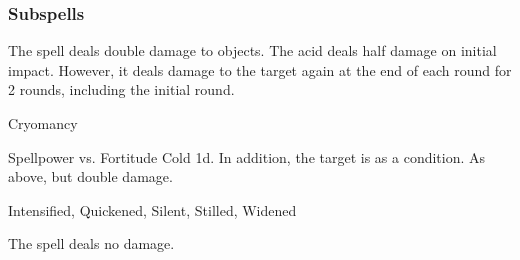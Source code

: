 \subsubsection{Subspells}
The spell deals double damage to objects.
The acid deals half damage on initial impact.
However, it deals damage to the target again at the end of each round for 2 rounds, including the initial round.
\begin{spellsection}{Cryomancy}
\begin{spellheader}
\end{spellheader}
\begin{spellcontent}
\begin{spelltargetinginfo}
\end{spelltargetinginfo}
\begin{spelleffects}
\begin{spellattack}{Spellpower vs. Fortitude}
\spellsuccess
Cold  \minus1d.
In addition, the target is \fatigued as a condition.
\spellcritical As above, but double damage.
\end{spellattack}
\end{spelleffects}
\end{spellcontent}
\begin{spellfooter}
 Intensified, Quickened, Silent, Stilled, Widened
\end{spellfooter}
\begin{spellsubcontent}
\begin{spellcantrip}
The spell deals no damage.
\end{spellcantrip}
\end{spellsubcontent}
\end{spellsection}

